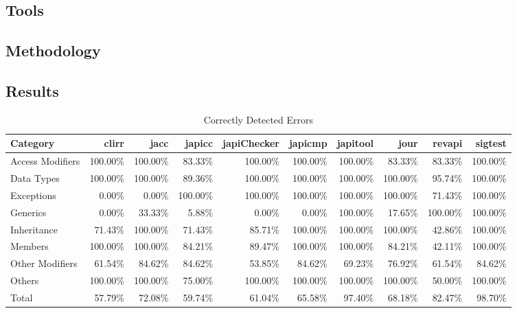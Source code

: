 \documentclass[conference]{IEEEtran}
\begin{document}
\subsection{Tools}

\subsection{Methodology}

\subsection{Results}

\begin{table*}[t]
  \centering
  \begin{tabular}{l | r r r r r r r r r }
Category   &  clirr   &  jacc   &  japicc   &  japiChecker   &  japicmp   &  japitool   &  jour   &  revapi   &  sigtest  \\
\hline
Access Modifiers   &  100.00\%   &  100.00\%   &  83.33\%   &  100.00\%   &  100.00\%   &  100.00\%   &  83.33\%   &  83.33\%   &  100.00\% \\
Data Types   &  100.00\%   &  100.00\%   &  89.36\%   &  100.00\%   &  100.00\%   &  100.00\%   &  100.00\%   &  95.74\%   &  100.00\%  \\
Exceptions   &  0.00\%   &  0.00\%   &  100.00\%   &  100.00\%   &  100.00\%   &  100.00\%   &  100.00\%   &  71.43\%   &  100.00\%  \\
Generics   &  0.00\%   &  33.33\%   &  5.88\%   &  0.00\%   &  0.00\%   &  100.00\%   &  17.65\%   &  100.00\%   &  100.00\%  \\
Inheritance   &  71.43\%   &  100.00\%   &  71.43\%   &  85.71\%   &  100.00\%   &  100.00\%   &  100.00\%   &  42.86\%   &  100.00\%  \\
Members   &  100.00\%   &  100.00\%   &  84.21\%   &  89.47\%   &  100.00\%   &  100.00\%   &  84.21\%   &  42.11\%   &  100.00\%  \\
Other Modifiers   &  61.54\%   &  84.62\%   &  84.62\%   &  53.85\%   &  84.62\%   &  69.23\%   &  76.92\%   &  61.54\%   &  84.62\%  \\
Others   &  100.00\%   &  100.00\%   &  75.00\%   &  100.00\%   &  100.00\%   &  100.00\%   &  100.00\%   &  50.00\%   &  100.00\%  \\
\hline
Total  &  57.79\%   &  72.08\%   &  59.74\%   &  61.04\%   &  65.58\%   &  97.40\%   &  68.18\%   &  82.47\%   &  98.70\%  \\  \end{tabular}
  \caption{Correctly Detected Errors}
  \label{tab:result}
\end{table*}
\end{document}
